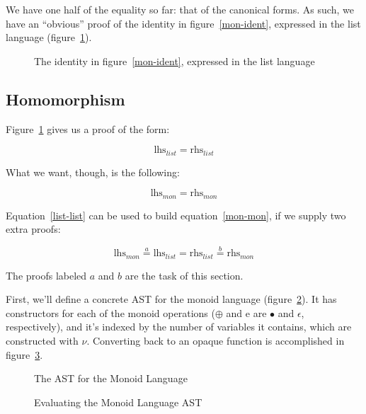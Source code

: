 \documentclass[draft, twocolumn]{article}
\begin{document}
We have one half of the equality so far: that of the canonical forms. As such,
we have an ``obvious'' proof of the identity in figure~\ref{mon-ident},
expressed in the list language (figure~\ref{list-obvious}).
\begin{figure}[!h]
  \caption{The identity in figure~\ref{mon-ident}, expressed in the list
    language}
  \label{list-obvious}
\end{figure}
\subsection{Homomorphism}
Figure~\ref{list-obvious} gives us a proof of the form:

\begin{equation}
  \label{list-list}
  \text{lhs}_{list} = \text{rhs}_{list}
\end{equation}

What we want, though, is the following:

\begin{equation}
  \label{mon-mon}
  \text{lhs}_{mon} = \text{rhs}_{mon}
\end{equation}

Equation~\ref{list-list} can be used to build equation~\ref{mon-mon}, if we
supply two extra proofs:

\begin{equation}
  \text{lhs}_{mon} \overset{a}{=} \text{lhs}_{list} = \text{rhs}_{list}
  \overset{b}{=} \text{rhs}_{mon}
\end{equation}

The proofs labeled \(a\) and \(b\) are the task of this section.

First, we'll define a concrete AST for the monoid language
(figure~\ref{mon-ast}). It has constructors for each of the monoid operations
(\(\oplus\) and \(\text{e}\) are \(\bullet\) and \(\epsilon\), respectively),
and it's indexed by the number of variables it contains, which are constructed
with \(\nu\). Converting back to an opaque function is accomplished in
figure~\ref{eval-ast}.

\begin{figure}
  \caption{The AST for the Monoid Language}
  \label{mon-ast}
\end{figure}
\begin{figure}
  \caption{Evaluating the Monoid Language AST}
  \label{eval-ast}
\end{figure}
\end{document}
